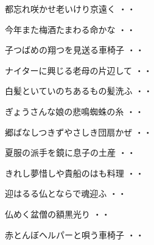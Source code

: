 \begin{shiika}都忘れ咲かせ老いけり京遠く
\hfill{・・}\end{shiika}

\begin{shiika}今年また梅酒たまわる命かな
\hfill{・・}\end{shiika}

\begin{shiika}子つばめの翔つを見送る車椅子
\hfill{・・}\end{shiika}

\begin{shiika}ナイターに興じる老母の片辺して
\hfill{・・}\end{shiika}

\begin{shiika}白髪といていのちあるもの髪洗ふ
\hfill{・・}\end{shiika}

\begin{shiika}ぎょうさんな娘の悲鳴蜘蛛の糸
\hfill{・・}\end{shiika}

\begin{shiika}郷ばなしつきずやさしき団扇かぜ
\hfill{・・}\end{shiika}

\begin{shiika}夏服の派手を鏡に息子の土産
\hfill{・・}\end{shiika}

\begin{shiika}きれし夢惜しや貴船のはも料理
\hfill{・・}\end{shiika}

\begin{shiika}迎はるる仏とならで魂迎ふ
\hfill{・・}\end{shiika}

\begin{shiika}仏めく盆僧の額黒光り
\hfill{・・}\end{shiika}

\begin{shiika}赤とんぼヘルパーと唄う車椅子
\hfill{・・}\end{shiika}

